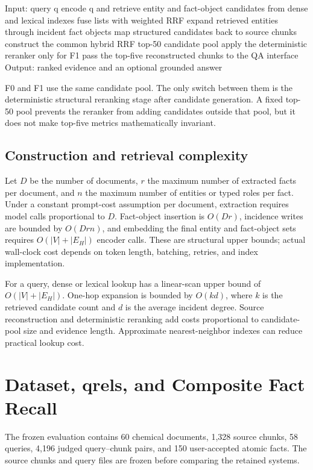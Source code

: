 Input: query q encode q and retrieve entity and fact-object candidates from dense and lexical indexes fuse lists with weighted RRF expand retrieved entities through incident fact objects map structured candidates back to source chunks construct the common hybrid RRF top-50 candidate pool apply the deterministic reranker only for F1 pass the top-five reconstructed chunks to the QA interface Output: ranked evidence and an optional grounded answer

F0 and F1 use the same candidate pool. The only switch between them is the deterministic structural reranking stage after candidate generation. A fixed top-50 pool prevents the reranker from adding candidates outside that pool, but it does not make top-five metrics mathematically invariant.

\subsection{Construction and retrieval complexity}

Let $D$ be the number of documents, $r$ the maximum number of extracted facts per document, and $n$ the maximum number of entities or typed roles per fact. Under a constant prompt-cost assumption per document, extraction requires model calls proportional to $D$. Fact-object insertion is $O(Dr)$, incidence writes are bounded by $O(Drn)$, and embedding the final entity and fact-object sets requires $O(|V|+|E_H|)$ encoder calls. These are structural upper bounds; actual wall-clock cost depends on token length, batching, retries, and index implementation.

For a query, dense or lexical lookup has a linear-scan upper bound of $O(|V|+|E_H|)$. One-hop expansion is bounded by $O(kd)$, where $k$ is the retrieved candidate count and $d$ is the average incident degree. Source reconstruction and deterministic reranking add costs proportional to candidate-pool size and evidence length. Approximate nearest-neighbor indexes can reduce practical lookup cost.

\section{Dataset, qrels, and Composite Fact Recall}

The frozen evaluation contains 60 chemical documents, 1,328 source chunks, 58 queries, 4,196 judged query--chunk pairs, and 150 user-accepted atomic facts. The source chunks and query files are frozen before comparing the retained systems.

